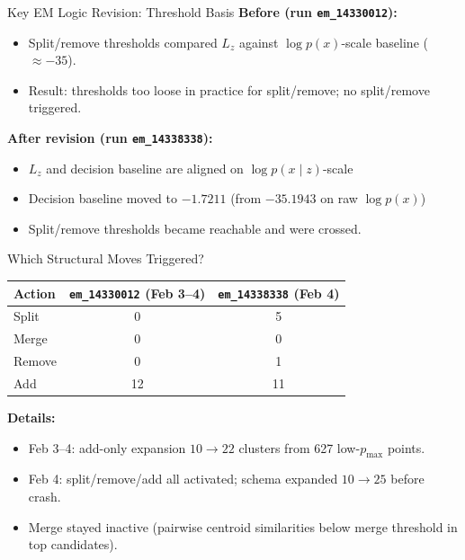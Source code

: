 \documentclass{beamer}
\begin{document}
\begin{frame}{Key EM Logic Revision: Threshold Basis}
\small
\textbf{Before (run \texttt{em\_14330012}):}
\begin{itemize}
  \item Split/remove thresholds compared \(L_z\) against \(\log p(x)\)-scale baseline (\(\approx -35\)).
  \item Result: thresholds too loose in practice for split/remove; no split/remove triggered.
\end{itemize}

\textbf{After revision (run \texttt{em\_14338338}):}
\begin{itemize}
  \item \(L_z\) and decision baseline are aligned on \(\log p(x\mid z)\)-scale
  \item Decision baseline moved to \(-1.7211\) (from \(-35.1943\) on raw \(\log p(x)\))
  \item Split/remove thresholds became reachable and were crossed.
\end{itemize}
\end{frame}

\begin{frame}{Which Structural Moves Triggered?}
\small
\begin{tabular}{lcc}
\toprule
Action & \texttt{em\_14330012} (Feb 3--4) & \texttt{em\_14338338} (Feb 4) \\
\midrule
Split & 0 & 5 \\
Merge & 0 & 0 \\
Remove & 0 & 1 \\
Add & 12 & 11 \\
\bottomrule
\end{tabular}

\vspace{0.6em}
\textbf{Details:}
\begin{itemize}
  \item Feb 3--4: add-only expansion \(10 \rightarrow 22\) clusters from 627 low-\(p_{\max}\) points.
  \item Feb 4: split/remove/add all activated; schema expanded \(10 \rightarrow 25\) before crash.
  \item Merge stayed inactive (pairwise centroid similarities below merge threshold in top candidates).
\end{itemize}
\end{frame}
\end{document}
